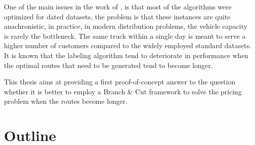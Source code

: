 One of the main issues in the work of \cite{pessoa2020generic}, is that
most of the algorithms were optimized for dated datasets, the problem
is that these instances are quite anachronistic, in practice, in modern
distribution problems, the vehicle capacity is rarely the bottleneck.
The same truck within a single day is meant to serve a higher number of customers
compared to the widely employed standard datasets.
It is known that the labeling algorithm tend to deteriorate in performance when
the optimal routes that need to be generated tend to become longer.

This thesis aims at providing a first proof-of-concept answer to the question
whether it is better to employ a Branch \& Cut framework to solve the pricing problem
when the routes become longer.


\section{Outline}
